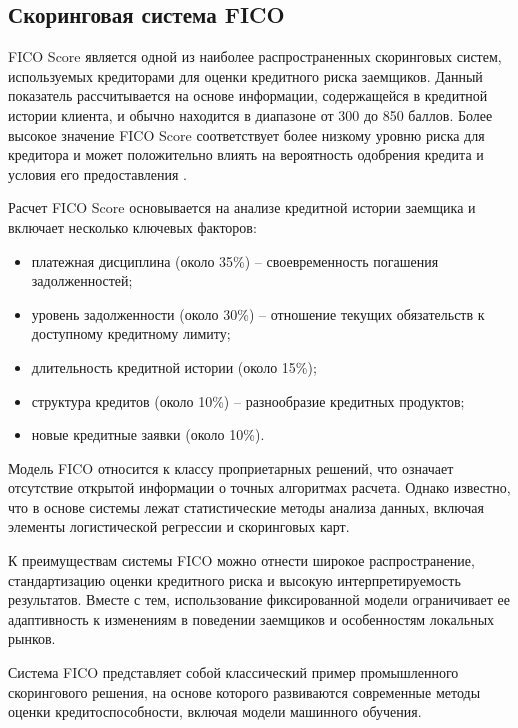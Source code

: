 
\subsection{Скоринговая система FICO}

FICO Score является одной из наиболее распространенных скоринговых систем, используемых кредиторами для оценки кредитного риска заемщиков. Данный показатель рассчитывается на основе информации, содержащейся в кредитной истории клиента, и обычно находится в диапазоне от 300 до 850 баллов. Более высокое значение FICO Score соответствует более низкому уровню риска для кредитора и может положительно влиять на вероятность одобрения кредита и условия его предоставления \cite{MyFicoCreditScores}.

Расчет FICO Score основывается на анализе кредитной истории заемщика и включает несколько ключевых факторов:

\begin{itemize}
  \item платежная дисциплина (около 35\%) -- своевременность погашения задолженностей;
  \item уровень задолженности (около 30\%) -- отношение текущих обязательств к доступному кредитному лимиту;
  \item длительность кредитной истории (около 15\%);
  \item структура кредитов (около 10\%) -- разнообразие кредитных продуктов;
  \item новые кредитные заявки (около 10\%).
\end{itemize}

Модель FICO относится к классу проприетарных решений, что означает отсутствие открытой информации о точных алгоритмах расчета. Однако известно, что в основе системы лежат статистические методы анализа данных, включая элементы логистической регрессии и скоринговых карт.

К преимуществам системы FICO можно отнести широкое распространение, стандартизацию оценки кредитного риска и высокую интерпретируемость результатов. Вместе с тем, использование фиксированной модели ограничивает ее адаптивность к изменениям в поведении заемщиков и особенностям локальных рынков.

Система FICO представляет собой классический пример промышленного скорингового решения, на основе которого развиваются современные методы оценки кредитоспособности, включая модели машинного обучения.

